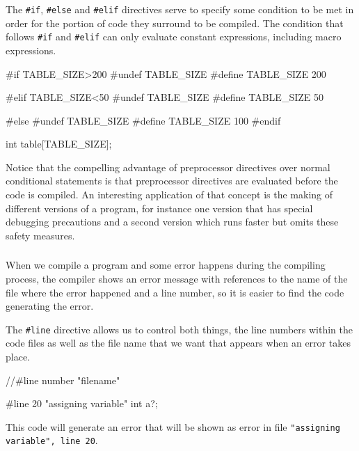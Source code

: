 \documentclass[10pt,a4paper]{scrartcl}
\begin{document}
\begin{multicols*}{2}
The \verb+#if+, \verb+#else+ and \verb+#elif+ directives serve to specify some condition to be met in order for the portion of code they surround to be compiled. The condition that follows \verb+#if+ and \verb+#elif+ can only evaluate constant expressions, including macro expressions.

\begin{TPCpp}
#if TABLE_SIZE>200
#undef TABLE_SIZE
#define TABLE_SIZE 200

#elif TABLE_SIZE<50
#undef TABLE_SIZE
#define TABLE_SIZE 50

#else
#undef TABLE_SIZE
#define TABLE_SIZE 100
#endif

int table[TABLE_SIZE];
\end{TPCpp}

Notice that the compelling advantage of preprocessor directives over normal conditional statements is that preprocessor directives are evaluated before the code is compiled. An interesting application of that concept is the making of different versions of a program, for instance one version that has special debugging precautions and a second version which runs faster but omits these safety measures.

\subsubsection{}

 When we compile a program and some error happens during the compiling process, the compiler shows an error message with references to the name of the file where the error happened and a line number, so it is easier to find the code generating the error.

The \verb+#line+ directive allows us to control both things, the line numbers within the code files as well as the file name that we want that appears when an error takes place.

\begin{TPCpp}
//#line number "filename"

#line 20 "assigning variable"
int a?;
\end{TPCpp}

This code will generate an error that will be shown as error in file \verb+"assigning variable", line 20+.

\subsubsection{}


\end{multicols*}
\end{document}
